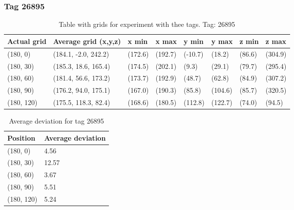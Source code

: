 \subsubsection{Tag 26895}
\begin{table}[H] 
    \begin{tabular}{|l|l|l|l|l|l|l|l|}
    \hline
    Actual grid & Average grid (x,y,z)        & x min      & x max       & y min      & y max   & z min   & z max    \\ \hline
    (180, 0)     & (184.1, -2.0, 242.2)      & (172.6)     & (192.7)    & (-10.7)     & (18.2)      & (86.6)     & (304.9)    \\ \hline
    (180, 30)     & (185.3, 18.6, 165.4)      & (174.5)     & (202.1)    & (9.3)     & (29.1)      & (79.7)     & (295.4)    \\ \hline
    (180, 60)     & (181.4, 56.6, 173.2)      & (173.7)     & (192.9)    & (48.7)     & (62.8)      & (84.9)     & (307.2)    \\ \hline
    (180, 90)     & (176.2, 94.0, 175.1)      & (167.0)     & (190.3)    & (85.8)     & (104.6)      & (85.7)     & (320.5)    \\ \hline
    (180, 120)     & (175.5, 118.3, 82.4)      & (168.6)     & (180.5)    & (112.8)     & (122.7)      & (74.0)     & (94.5)    \\ \hline
\end{tabular}
\label{Tab:three-tag-experiment-result-tag-26895}
\caption{Table with grids for experiment with thee tags. Tag: 26895}
\end{table}

\begin{table}[]
    \centering
    \begin{tabular}{|l|l|}
    \hline
    Position   & Average deviation \\ \hline
    (180, 0)   & 4.56              \\ \hline
    (180, 30)  & 12.57             \\ \hline
    (180, 60)  & 3.67              \\ \hline
    (180, 90)  & 5.51              \\ \hline
    (180, 120) & 5.24              \\ \hline
    \end{tabular}
\caption{Average deviation for tag 26895}
\end{table}


